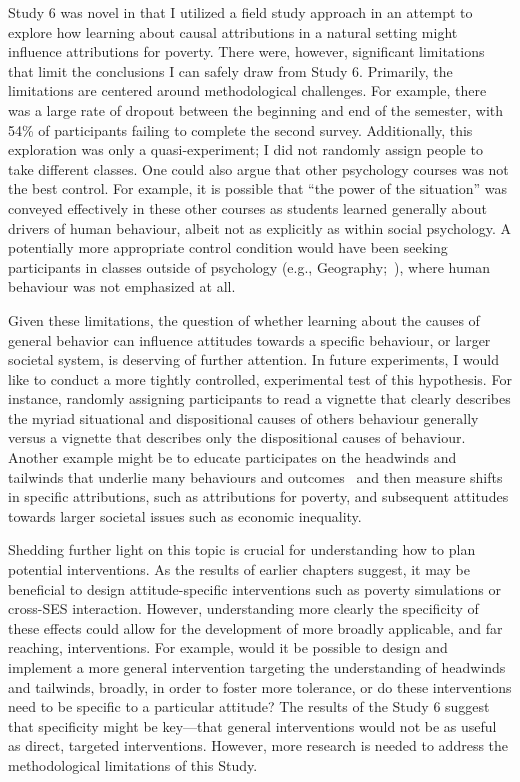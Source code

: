 \documentclass{sfuthesis}
\begin{document}
Study 6 was novel in that I utilized a field study approach in an attempt to explore how learning about causal attributions in a natural setting might influence attributions for poverty. There were, however, significant limitations that limit the conclusions I can safely draw from Study 6. Primarily, the limitations are centered around methodological challenges. For example, there was a large rate of dropout between the beginning and end of the semester, with 54\% of participants failing to complete the second survey. Additionally, this exploration was only a quasi-experiment; I did not randomly assign people to take different classes. One could also argue that other psychology courses was not the best control. For example, it is possible that “the power of the situation” was conveyed effectively in these other courses as students learned generally about drivers of human behaviour, albeit not as explicitly as within social psychology. A potentially more appropriate control condition would have been seeking participants in classes outside of psychology (e.g., Geography;~\cite{shariff14}), where human behaviour was not emphasized at all.

Given these limitations, the question of whether learning about the causes of general behavior can influence attitudes towards a specific behaviour, or larger societal system, is deserving of further attention. In future experiments, I would like to conduct a more tightly controlled, experimental test of this hypothesis. For instance, randomly assigning participants to read a vignette that clearly describes the myriad situational and dispositional causes of others behaviour generally versus a vignette that describes only the dispositional causes of behaviour. Another example might be to educate participates on the headwinds and tailwinds that underlie many behaviours and outcomes~\cite{davidai16} and then measure shifts in specific attributions, such as attributions for poverty, and subsequent attitudes towards larger societal issues such as economic inequality.

	Shedding further light on this topic is crucial for understanding how to plan potential interventions. As the results of earlier chapters suggest, it may be beneficial to design attitude-specific interventions such as poverty simulations or cross-SES interaction. However, understanding more clearly the specificity of these effects could allow for the development of more broadly applicable, and far reaching, interventions. For example, would it be possible to design and implement a more general intervention targeting the understanding of headwinds and tailwinds, broadly, in order to foster more tolerance, or do these interventions need to be specific to a particular attitude? The results of the Study 6 suggest that specificity might be key—that general interventions would not be as useful as direct, targeted interventions. However, more research is needed to address the methodological limitations of this Study.   
\end{document}

